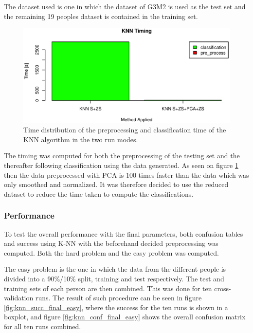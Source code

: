 The dataset used is one in which the dataset of G3M2 is used as the test set and the remaining 19 peoples dataset is contained in the training set.


\begin{figure}[H]
\centering
\includegraphics[width =  \textwidth]{graphics/compare_timing_knn_smoothVSpca}
\caption[Time distribution for K-NN.]{Time distribution of the preprocessing and classification time of the KNN algorithm in the two run modes.}
\label{fig:knn_timing_comp}
\end{figure}

The timing was computed for both the preprocessing of the testing set and the thereafter following classification using the data generated.
As seen on figure \ref{fig:knn_timing_comp} then the data preprocessed with PCA is 100 times faster than the data which was only smoothed and normalized.
It was therefore decided to use the reduced dataset to reduce the time taken to compute the classifications.


\subsubsection{Performance}

To test the overall performance with the final parameters, both confusion tables and success using K-NN with the beforehand decided preprocessing was computed.
Both the hard problem and the easy problem was computed.

The easy problem is the one in which the data from the different people is divided into a 90\%/10\% split, training and test respectively.
The test and training sets of each person are then combined.
This was done for ten cross-validation runs.
The result of such procedure can be seen in figure \ref{fig:knn_succ_final_easy}, where the success for the ten runs is shown in a boxplot, and figure \ref{fig:knn_conf_final_easy} shows the overall confusion matrix for all ten runs combined.


